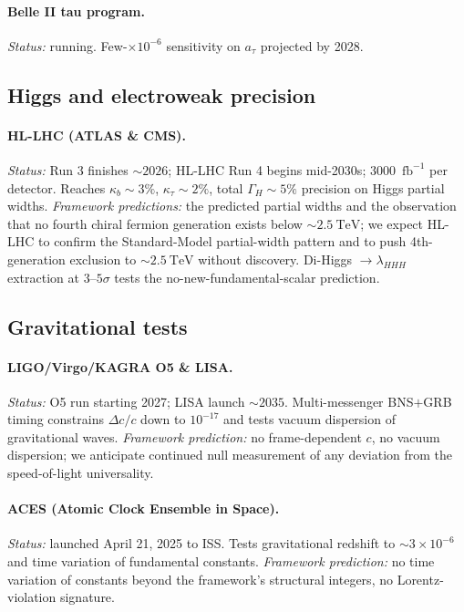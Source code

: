 \documentclass[reprint,amsmath,amssymb,aps,prd,longbibliography,floatfix]{revtex4-2}
\begin{document}
\paragraph{Belle II tau program.}
\emph{Status:} running. Few-${\times}10^{-6}$ sensitivity on $a_\tau$
projected by 2028.

\subsection*{Higgs and electroweak precision}

\paragraph{HL-LHC (ATLAS \& CMS).}
\emph{Status:} Run 3 finishes $\sim\!2026$; HL-LHC Run 4 begins
mid-2030s; 3000~$\mathrm{fb}^{-1}$ per detector. Reaches
$\kappa_b \sim 3\%$, $\kappa_\tau \sim 2\%$, total $\Gamma_H \sim 5\%$
precision on Higgs partial widths. \emph{Framework predictions:}
the predicted partial widths and the observation that no fourth
chiral fermion generation exists below $\sim\!2.5~\mathrm{TeV}$;
we expect HL-LHC to confirm the Standard-Model partial-width
pattern and to push 4th-generation exclusion to $\sim\!2.5~\mathrm{TeV}$
without discovery. Di-Higgs $\to \lambda_{HHH}$ extraction at
$3$--$5\sigma$ tests the no-new-fundamental-scalar prediction.

\subsection*{Gravitational tests}

\paragraph{LIGO/Virgo/KAGRA O5 \& LISA.}
\emph{Status:} O5 run starting 2027; LISA launch $\sim\!2035$.
Multi-messenger BNS$+$GRB timing constrains $\Delta c/c$ down to
$10^{-17}$ and tests vacuum dispersion of gravitational waves.
\emph{Framework prediction:} no frame-dependent $c$, no vacuum
dispersion; we anticipate continued null measurement of any
deviation from the speed-of-light universality.

\paragraph{ACES (Atomic Clock Ensemble in Space).}
\emph{Status:} launched April 21, 2025 to ISS. Tests gravitational
redshift to $\sim\!3\times 10^{-6}$ and time variation of fundamental
constants. \emph{Framework prediction:} no time variation of
constants beyond the framework's structural integers, no
Lorentz-violation signature.
\end{document}
